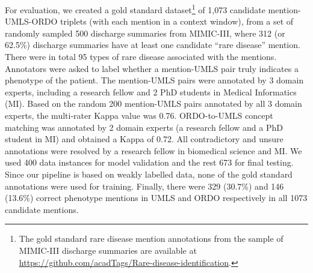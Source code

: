 \documentclass[letterpaper, 10 pt, conference]{ieeeconf}
\begin{document}
For evaluation, we created a gold standard dataset\footnote{The gold standard rare disease mention annotations from the sample of MIMIC-III discharge summaries are available at \url{https://github.com/acadTags/Rare-disease-identification}.} of 1,073 candidate mention-UMLS-ORDO triplets (with each mention in a context window), from a set of randomly sampled 500 discharge summaries from MIMIC-III, where 312 (or 62.5\%) discharge summaries have at least one candidate ``rare disease'' mention. There were in total 95 types of rare disease associated with the mentions. Annotators were asked to label whether a mention-UMLS pair truly indicates a phenotype of the patient. The mention-UMLS pairs were annotated by 3 domain experts, including a research fellow and 2 PhD students in Medical Informatics (MI). Based on the random 200 mention-UMLS pairs annotated by all 3 domain experts, the multi-rater Kappa value was 0.76. ORDO-to-UMLS concept matching was annotated by 2 domain experts (a research fellow and a PhD student in MI) and obtained a Kappa of 0.72. All contradictory and unsure annotations were resolved by a research fellow in biomedical science and MI. We used 400 data instances for model validation and the rest 673 for final testing. Since our pipeline is based on weakly labelled data, none of the gold standard annotations were used for training. Finally, there were 329 (30.7\%) and 146 (13.6\%) correct phenotype mentions in UMLS and ORDO respectively in all 1073 candidate mentions.
\end{document}
